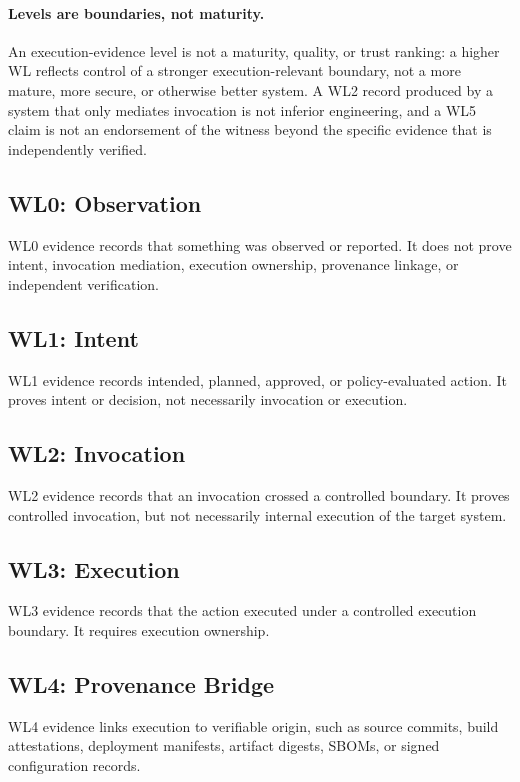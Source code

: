 \documentclass[11pt]{article}
\begin{document}
\paragraph{Levels are boundaries, not maturity.} An execution-evidence level is not a maturity, quality, or trust ranking: a higher WL reflects control of a stronger execution-relevant boundary, not a more mature, more secure, or otherwise better system. A WL2 record produced by a system that only mediates invocation is not inferior engineering, and a WL5 claim is not an endorsement of the witness beyond the specific evidence that is independently verified.

\subsection{WL0: Observation}
WL0 evidence records that something was observed or reported. It does not prove intent, invocation mediation, execution ownership, provenance linkage, or independent verification.

\subsection{WL1: Intent}
WL1 evidence records intended, planned, approved, or policy-evaluated action. It proves intent or decision, not necessarily invocation or execution.

\subsection{WL2: Invocation}
WL2 evidence records that an invocation crossed a controlled boundary. It proves controlled invocation, but not necessarily internal execution of the target system.

\subsection{WL3: Execution}
WL3 evidence records that the action executed under a controlled execution boundary. It requires execution ownership.

\subsection{WL4: Provenance Bridge}
WL4 evidence links execution to verifiable origin, such as source commits, build attestations, deployment manifests, artifact digests, SBOMs, or signed configuration records.
\end{document}
